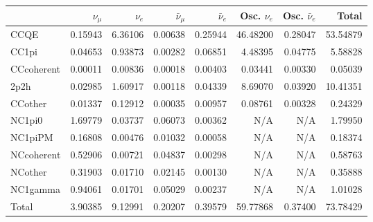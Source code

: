 \begin{tabular} { | l ||r | r | r | r | r | r | | r | }
\hline
              & $\nu_\mu$            & $\nu_e$              & $\bar{\nu}_{\mu}$    & $\bar{\nu}_{e}$      & Osc. $\nu_e$         & Osc. $\bar{\nu}_{e}$ & Total                \\ \hline\hline
 CCQE         & 0.15943              & 6.36106              & 0.00638              & 0.25944              & 46.48200             & 0.28047              & 53.54879             \\ \hline
 CC1pi        & 0.04653              & 0.93873              & 0.00282              & 0.06851              & 4.48395              & 0.04775              & 5.58828              \\ \hline
 CCcoherent   & 0.00011              & 0.00836              & 0.00018              & 0.00403              & 0.03441              & 0.00330              & 0.05039              \\ \hline
 2p2h         & 0.02985              & 1.60917              & 0.00118              & 0.04339              & 8.69070              & 0.03920              & 10.41351             \\ \hline
 CCother      & 0.01337              & 0.12912              & 0.00035              & 0.00957              & 0.08761              & 0.00328              & 0.24329              \\ \hline
 NC1pi0       & 1.69779              & 0.03737              & 0.06073              & 0.00362              & N/A                  & N/A                  & 1.79950              \\ \hline
 NC1piPM      & 0.16808              & 0.00476              & 0.01032              & 0.00058              & N/A                  & N/A                  & 0.18374              \\ \hline
 NCcoherent   & 0.52906              & 0.00721              & 0.04837              & 0.00298              & N/A                  & N/A                  & 0.58763              \\ \hline
 NCother      & 0.31903              & 0.01710              & 0.02145              & 0.00130              & N/A                  & N/A                  & 0.35888              \\ \hline
 NC1gamma     & 0.94061              & 0.01701              & 0.05029              & 0.00237              & N/A                  & N/A                  & 1.01028              \\ \hline
\hline
 Total        & 3.90385              & 9.12991              & 0.20207              & 0.39579              & 59.77868             & 0.37400              & 73.78429             \\ \hline

\end{tabular}
